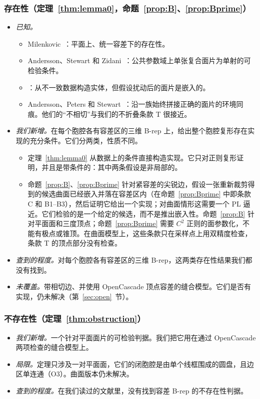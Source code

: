 \subsubsection*{存在性（定理~\ref{thm:lemma0}，命题~\ref{prop:B}、\ref{prop:Bprime}）}
\begin{itemize}
\item \emph{已知。}
  \begin{itemize}
  \item Milenkovic~\cite{Milenkovic88}：平面上、统一容差下的存在性。
  \item Andersson、Stewart 和 Zidani~\cite{ASZ06}：公共参数域上单张复合面片为单射的可检验条件。
  \item \cite{ASZ07,SZ08}：从不一致数据构造实体，但假设扰动后的面片是嵌入的。
  \item Andersson、Peters 和 Stewart~\cite[Thm.~1]{APS00}：沿一族始终拼接正确的面片的环境同痕。他们的``不相切''与我们的不折叠条款 T 很接近。
  \end{itemize}
\item \emph{我们新增。}在每个胞腔各有容差区的三维 B-rep 上，给出整个胞腔复形存在实现的充分条件。它们分两类，性质不同。
  \begin{itemize}
  \item 定理~\ref{thm:lemma0} 从数据上的条件直接构造实现。它只对正则复形证明，并且是带条件的：其中两条假设是非局部的。
  \item 命题~\ref{prop:B}、\ref{prop:Bprime} 针对紧容差的尖锐边，假设一张重新裁剪得到的候选曲面已经嵌入并落在容差区内（在命题~\ref{prop:Bprime} 中即条款 C 和 B1--B3），然后证明它给出一个实现；对曲面情形这需要一个 PL 逼近。它们检验的是一个给定的候选，而不是推出嵌入性。命题~\ref{prop:B} 针对平面面和三度顶点；命题~\ref{prop:Bprime} 需要 $C^2$ 正则的面参数化，不能有极点或锥顶。在曲面模型上，这些条款只在采样点上用双精度检查，条款 T 的顶点部分没有检查。
  \end{itemize}
\item \emph{查到的程度。}对每个胞腔各有容差区的三维 B-rep，这两类存在性结果我们都没有找到。
\item \emph{未覆盖。}带相切边、并使用 OpenCascade 顶点容差的缝合模型。它们是否有实现，仍未解决（第~\ref{sec:open}~节）。
\end{itemize}

\subsubsection*{不存在性（定理~\ref{thm:obstruction}）}
\begin{itemize}
\item \emph{我们新增。}一个针对平面面片的可检验判据。我们把它用在通过 OpenCascade 两项检查的缝合模型上。
\item \emph{局限。}定理只涉及一对平面面，它们的闭胞腔是由单个线框围成的圆盘，且边区单连通（O3）。曲面版本仍未解决。
\item \emph{查到的程度。}在我们读过的文献里，没有找到容差 B-rep 的不存在性判据。
\end{itemize}

